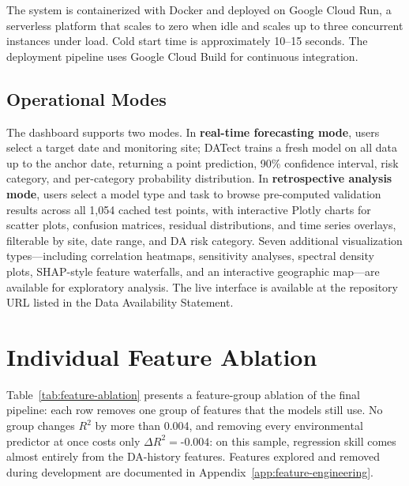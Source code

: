 \documentclass[toxins,article,submit,moreauthors]{Definitions/mdpi}
\begin{document}
The system is containerized with Docker and deployed on Google Cloud Run, a serverless platform that scales to zero when idle and scales up to three concurrent instances under load. Cold start time is approximately 10--15 seconds. The deployment pipeline uses Google Cloud Build for continuous integration.

\subsection*{Operational Modes}

The dashboard supports two modes. In \textbf{real-time forecasting mode}, users select a target date and monitoring site; DATect trains a fresh model on all data up to the anchor date, returning a point prediction, 90\% confidence interval, risk category, and per-category probability distribution. In \textbf{retrospective analysis mode}, users select a model type and task to browse pre-computed validation results across all 1,054 cached test points, with interactive Plotly charts for scatter plots, confusion matrices, residual distributions, and time series overlays, filterable by site, date range, and DA risk category. Seven additional visualization types---including correlation heatmaps, sensitivity analyses, spectral density plots, SHAP-style feature waterfalls, and an interactive geographic map---are available for exploratory analysis. The live interface is available at the repository URL listed in the Data Availability Statement.


\section{Individual Feature Ablation}
\label{app:feature-ablation}

Table~\ref{tab:feature-ablation} presents a feature-group ablation of the final pipeline: each row removes one group of features that the models still use. No group changes $R^2$ by more than 0.004, and removing every environmental predictor at once costs only $\Delta R^2 = $-$0.004$: on this sample, regression skill comes almost entirely from the DA-history features. Features explored and removed during development are documented in Appendix~\ref{app:feature-engineering}.
\end{document}
